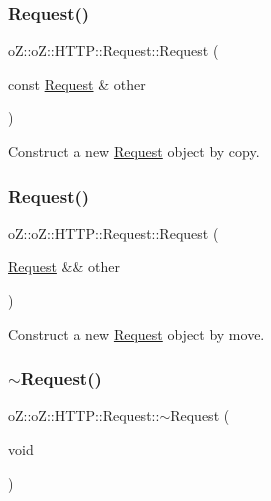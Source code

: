 \subsubsection{\texorpdfstring{Request()}{Request()}\hspace{0.1cm}{\footnotesize\ttfamily [2/3]}}
{\footnotesize\ttfamily o\+Z\+::o\+Z\+::\+H\+T\+T\+P\+::\+Request\+::\+Request (\begin{DoxyParamCaption}\item[{const \mbox{\hyperlink{classo_z_1_1o_z_1_1_h_t_t_p_1_1_request}{Request}} \&}]{other }\end{DoxyParamCaption})\hspace{0.3cm}{\ttfamily [default]}}



Construct a new \mbox{\hyperlink{classo_z_1_1o_z_1_1_h_t_t_p_1_1_request}{Request}} object by copy. 

\mbox{\label{classo_z_1_1o_z_1_1_h_t_t_p_1_1_request_a37b5a62d0ae99aba94b2fc18ad8ef886}} 
\subsubsection{\texorpdfstring{Request()}{Request()}\hspace{0.1cm}{\footnotesize\ttfamily [3/3]}}
{\footnotesize\ttfamily o\+Z\+::o\+Z\+::\+H\+T\+T\+P\+::\+Request\+::\+Request (\begin{DoxyParamCaption}\item[{\mbox{\hyperlink{classo_z_1_1o_z_1_1_h_t_t_p_1_1_request}{Request}} \&\&}]{other }\end{DoxyParamCaption})\hspace{0.3cm}{\ttfamily [default]}}



Construct a new \mbox{\hyperlink{classo_z_1_1o_z_1_1_h_t_t_p_1_1_request}{Request}} object by move. 

\mbox{\label{classo_z_1_1o_z_1_1_h_t_t_p_1_1_request_a5d6857d241abfa036333dd12836824ea}} 
\subsubsection{\texorpdfstring{$\sim$Request()}{~Request()}}
{\footnotesize\ttfamily o\+Z\+::o\+Z\+::\+H\+T\+T\+P\+::\+Request\+::$\sim$\+Request (\begin{DoxyParamCaption}\item[{void}]{ }\end{DoxyParamCaption})\hspace{0.3cm}{\ttfamily [default]}}



